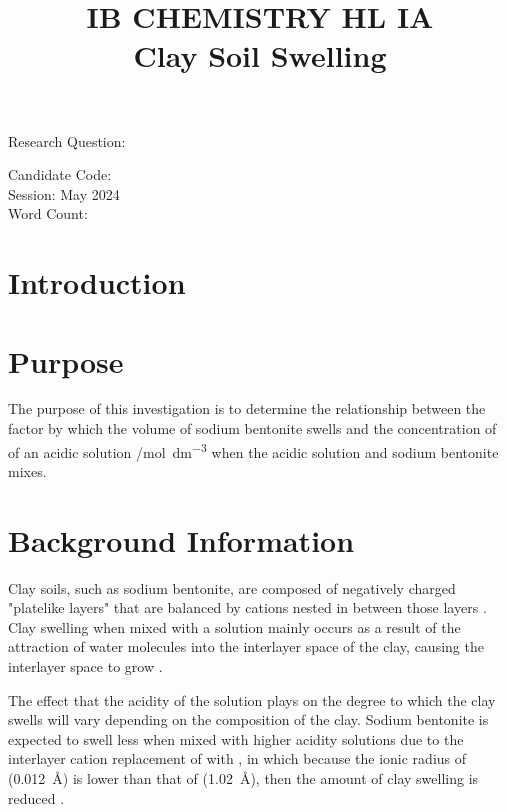 \documentclass[11pt, letterpaper]{article}
\title{IB CHEMISTRY HL IA
\\
Clay Soil Swelling}
\author{}
\date{}
\begin{document}
\nocite{*}

\maketitle

\begin{center}
    Research Question:
    \\
\end{center}

\begin{center}
    Candidate Code:
    \\
    Session: May 2024
    \\
    Word Count:
\end{center}
\newpage

\tableofcontents
\newpage


\section{Introduction}
\setcounter{page}{1}

\section{Purpose}

The purpose of this investigation is to determine the relationship between
the factor by which the volume of
sodium bentonite swells and the concentration of  of an acidic solution /\unit{mol.dm^{-3}} when the acidic solution and sodium bentonite
mixes.

\section{Background Information}

Clay soils, such as sodium bentonite, are composed of negatively charged
"platelike layers" that are balanced by cations nested in between
those layers \cite{chenClaySwellingRole2022}. Clay swelling when mixed with a solution mainly occurs
as a result of the attraction of water molecules into the interlayer space
of the clay, causing the interlayer space to grow \cite{chenClaySwellingRole2022}.

The effect that the acidity of the solution plays on the degree to which
the clay swells will vary depending on the composition of the clay.
Sodium bentonite is expected to swell less when mixed with higher acidity
solutions due to the interlayer cation replacement
of  with , in which because the
ionic radius of  (\SI{0.012}{\angstrom})
is lower than that of  (\SI{1.02}{\angstrom}),
then the amount of clay swelling is reduced \cite{ramavaraprasadSwellingCharacteristicsSoils2018a}.
\end{document}
